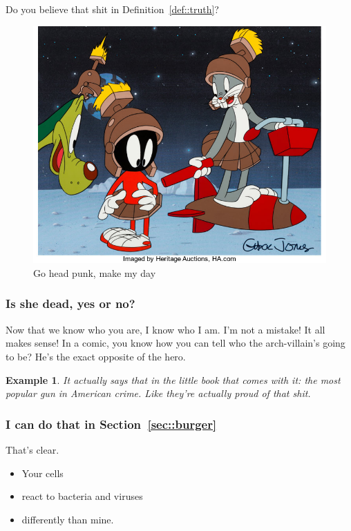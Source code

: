 \documentclass[a4paper, 11pt]{article}
\newtheorem{example}{Example}
\begin{document}
Do you believe that shit in Definition~\ref{def::truth}?

\begin{figure}[ht!]
 \centering
 \includegraphics[width=0.7\linewidth]{picture.jpg}
 \caption{Go head punk, make my day}
 \label{fig::example::one}
\end{figure}

\subsubsection{Is she dead, yes or no?} 

\begin{multicols}{2}
Now that we know who you are, I know who I am. I'm not a mistake! It all makes sense! In a comic, you know how you can tell who the arch-villain's going to be? He's the exact opposite of the hero.

\begin{example}
It actually says that in the little book that comes with it: the most popular gun in American crime. Like they're actually proud of that shit. 
\end{example}

\end{multicols}

\subsubsection{I can do that in Section~\ref{sec::burger}} 

That's clear.

\begin{itemize}
 \item Your cells 
 \item react to bacteria and viruses 
 \item differently than mine.
\end{itemize}
\end{document}
